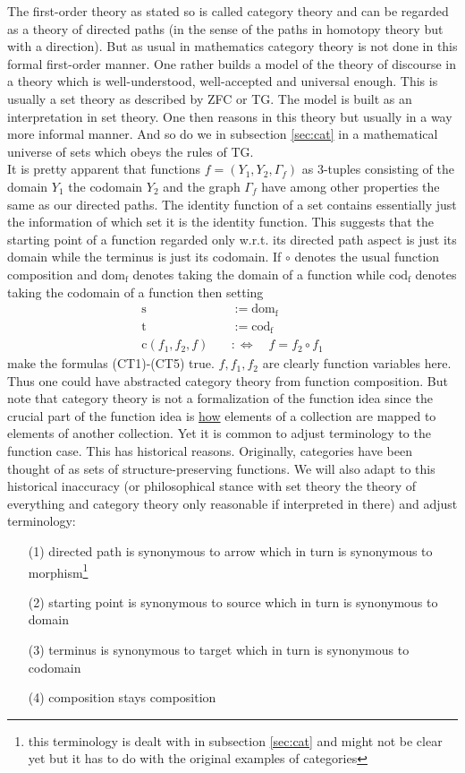 The first-order theory as stated so is called category theory and can be regarded as a theory of directed paths (in the sense of the paths in homotopy theory but with a direction). But as usual in mathematics category theory is not done in this formal first-order manner. One rather builds a model of the theory of discourse in a theory which is well-understood, well-accepted and universal enough. This is usually a set theory as described by ZFC or TG. The model is built as an interpretation in set theory. One then reasons in this theory but usually in a way more informal manner. And so do we in subsection \ref{sec:cat} in a mathematical universe of sets which obeys the rules of TG.
\\
It is pretty apparent that functions $f = (Y_{1},Y_{2},\Gamma_{f})$ as $3$-tuples consisting of the domain $Y_{1}$ the codomain $Y_{2}$ and the graph $\Gamma_{f}$ have among other properties the same as our directed paths. The identity function of a set contains essentially just the information of which set it is the identity function. This suggests that the starting point of a function regarded only w.r.t.  its directed path aspect is just its domain while the terminus is just its codomain. If $\circ$ denotes the usual function composition and $\mathrm{dom}_{\mathrm{f}}$ denotes taking the domain of a function while $\mathrm{cod}_{\mathrm{f}}$ denotes taking the codomain of a function then setting
\begin{align*}
  \mathrm{s}
  &:=
  \mathrm{dom}_{\mathrm{f}}
  \\
  \mathrm{t}
  &:=
  \mathrm{cod}_{\mathrm{f}}
  \\
  \mathrm{c}(f_{1},f_{2},f)
  \quad
  &:\Leftrightarrow
  \quad
  f
  =
  f_{2}
  \circ
  f_{1}
\end{align*}
make the formulas (CT1)-(CT5) true. $f,f_{1},f_{2}$ are clearly function variables here. Thus one could have abstracted category theory from function composition. But note that category theory is not a formalization of the function idea since the crucial part of the function idea is \underline{how} elements of a collection are mapped to elements of another collection. Yet it is common to adjust terminology to the function case. This has historical reasons. Originally, categories have been thought of as sets of structure-preserving functions. We will also adapt to this historical inaccuracy (or philosophical stance with set theory the theory of everything and category theory only reasonable if interpreted in there) and adjust terminology:
\begin{enumerate}
\item[(1)]
directed path is synonymous to arrow which in turn is synonymous to morphism\footnote{this terminology is dealt with in subsection \ref{sec:cat} and might not be clear yet but it has to do with the original examples of categories}
\item[(2)]
starting point is synonymous to source which in turn is synonymous to domain
\item[(3)]
terminus is synonymous to target which in turn is synonymous to codomain
\item[(4)]
composition stays composition
\end{enumerate}
